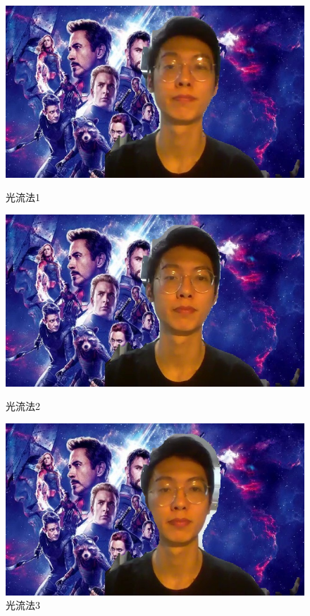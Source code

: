 \documentclass[11pt]{article}
\begin{document}
\begin{figure}[H]
    \centering
    \begin{minipage}[t]{0.32\textwidth}
        \centering
        \includegraphics[width=\textwidth]{output_0.jpg}
        \caption{光流法1}
        \label{fig:image8}
    \end{minipage}\hfill
    \begin{minipage}[t]{0.32\textwidth}
        \centering
        \includegraphics[width=\textwidth]{output_1.jpg}
        \caption{光流法2}
        \label{fig:image9}
    \end{minipage}\hfill
    \begin{minipage}[t]{0.32\textwidth}
        \centering
        \includegraphics[width=\textwidth]{output_2.jpg}
        \caption{光流法3}
        \label{fig:image10}
    \end{minipage}
\end{figure}
\end{document}
